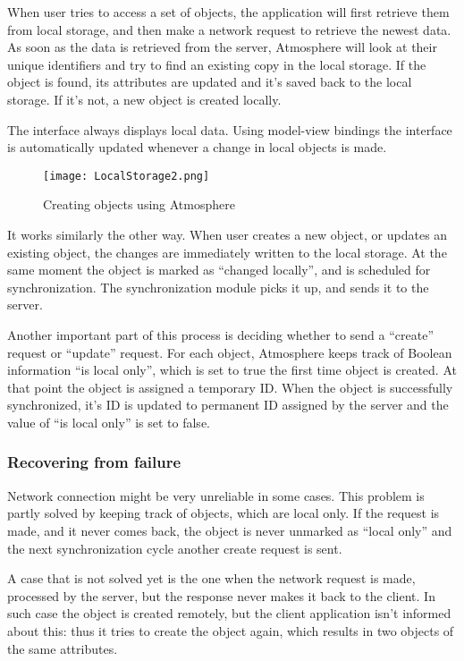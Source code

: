 When user tries to access a set of objects, the application will first retrieve them from local storage, and then make a network request to retrieve the newest data. As soon as the data is retrieved from the server, Atmosphere will look at their unique identifiers and try to find an existing copy in the local storage. If the object is found, its attributes are updated and it’s saved back to the local storage. If it’s not, a new object is created locally.

The interface always displays local data. Using model-view bindings the interface is automatically updated whenever a change in local objects is made.

\begin{figure}[ht!]
\centering
\texttt{[image: LocalStorage2.png]}
\caption{Creating objects using Atmosphere \label{fig:2}}
\end{figure}

It works similarly the other way. When user creates a new object, or updates an existing object, the changes are immediately written to the local storage. At the same moment the object is marked as “changed locally”, and is scheduled for synchronization. The synchronization module picks it up, and sends it to the server.

Another important part of this process is deciding whether to send a “create” request or “update” request. For each object, Atmosphere keeps track of Boolean information “is local only”, which is set to true the first time object is created. At that point the object is assigned a temporary ID. When the object is successfully synchronized, it’s ID is updated to permanent ID assigned by the server and the value of “is local only” is set to false.

\subsubsection{Recovering from failure}

Network connection might be very unreliable in some cases. This problem is partly solved by keeping track of objects, which are local only. If the request is made, and it never comes back, the object is never unmarked as “local only” and the next synchronization cycle another create request is sent. 

A case that is not solved yet is the one when the network request is made, processed by the server, but the response never makes it back to the client. In such case the object is created remotely, but the client application isn’t informed about this: thus it tries to create the object again, which results in two objects of the same attributes.

